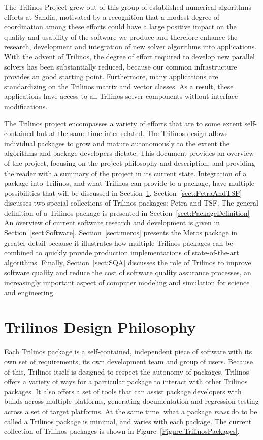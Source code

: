 \documentclass[acmtoms,acmnow]{acmtrans2m}
\begin{document}
The Trilinos Project grew out of this group of established numerical algorithms
efforts at Sandia, motivated by  a recognition that a modest degree of 
coordination among these efforts could have a large positive impact on 
the quality and usability of the software we produce and therefore enhance the
research, development and integration of new solver algorithms into
applications.  With the advent of Trilinos, the degree of effort required 
to develop new parallel solvers has been 
substantially reduced, because our common infrastructure provides an good 
starting point.  Furthermore, many applications are standardizing on the 
Trilinos matrix and vector classes.  As a result, these applications
have access to all Trilinos solver components without  
interface modifications. 

The Trilinos project encompasses a variety of efforts that are to some
extent self-contained but at the same time inter-related.  The
Trilinos design allows individual packages to grow and mature
autonomously to the extent the algorithms and package developers
dictate.  This document provides an overview of the project,
focusing on the project philosophy and description, and
providing the reader with a summary of the project in its current state.  
Integration of a package into Trilinos, and what Trilinos can provide
to a package, have multiple possibilities
that will be discussed in Section~\ref{sect:TrilinosDesign}.
Section~\ref{sect:PetraAndTSF} discusses two special collections of Trilinos
packages: Petra and TSF.  The general definition of a Trilinos
package is presented in Section~\ref{sect:PackageDefinition}
An overview of current software research and
development is given in Section~\ref{sect:Software}. 
Section~\ref{sect:meros} presents the Meros package in greater detail
because it illustrates how multiple Trilinos packages can be combined to quickly provide
production implementations of state-of-the-art algorithms.
Finally, Section~\ref{sect:SQA} discusses the role of Trilinos to improve software quality
and reduce the cost of software quality assurance processes, an increasingly important aspect
of computer modeling and simulation for science and engineering.  


\section{Trilinos Design Philosophy}
\label{sect:TrilinosDesign}
Each Trilinos package is a self-contained, independent piece
of software with its own set of requirements, its own development team
and group of users.  Because of this,
Trilinos itself is designed to respect the autonomy of packages.
Trilinos offers a variety of ways for a particular package to interact 
with other Trilinos packages.  It also offers a set of tools that can
assist package developers with builds across multiple platforms, generating
documentation and regression testing across a set of target platforms.
At the same time, what a package {\it must} do to be called a Trilinos
package is minimal, and varies with each package.  The current
collection of Trilinos packages is shown in Figure~\ref{Figure:TrilinosPackages}.
\end{document}
